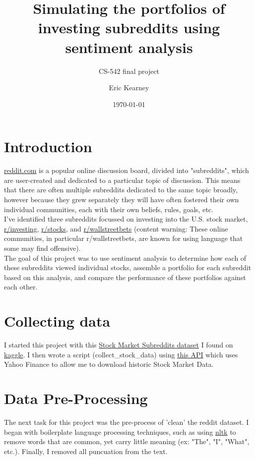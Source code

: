 \documentclass[11pt]{article}
\title{Simulating the portfolios of investing subreddits using sentiment analysis}
\author{CS-542 final project}
\author{Eric Kearney}
\date{\today}
\begin{document}
\maketitle
\thispagestyle{empty}

\section{Introduction}
    \href{reddit.com}{reddit.com} is a popular online discussion board, divided
    into "subreddits", which are user-created and dedicated to a particular
    topic of discussion. This means that there are often multiple subreddits
    dedicated to the same topic broadly, however because they grew separately
    they will have often fostered their own individual communities, each with
    their own beliefs, rules, goals, etc.\\

    I've identified three subreddits focussed on investing into the U.S. stock
    market, \href{https://www.reddit.com/r/investing/}{r/investing},
    \href{https://www.reddit.com/r/stocks/}{r/stocks}, 
    and \href{https://www.reddit.com/r/wallstreetbets/}{r/wallstreetbets}
    (content warning: These online communities, in particular r/wallstreetbets,
    are known for using language that some may find offensive).\\

    The goal of this project was to use sentiment analysis to determine how
    each of these subreddits viewed individual stocks, assemble a portfolio
    for each subreddit based on this analysis, and compare the performance of
    these portfolios against each other.\\
\section{Collecting data}
    I started this project with this
    \href{https://www.kaggle.com/datasets/yorkehead/stock-market-subreddits}
    {Stock Market Subreddits dataset} I found on
    \href{https://www.kaggle.com/}{kaggle}. I then wrote a script
    (collect\_stock\_data) using
    \href{https://pypi.org/project/yahoo-finance/}{this API} which uses Yahoo
    Finance to allow me to download historic Stock Market Data.
\section{Data Pre-Processing}
    The next task for this project was the pre-process of 'clean' the reddit
    dataset. I began with boilerplate language processing techniques, such as
    using \href{https://www.nltk.org/}{nltk} to remove words that are common,
    yet carry little meaning (ex: "The", "I", "What", etc.). Finally, I
    removed all puncuation from the text.\\
\end{document}
